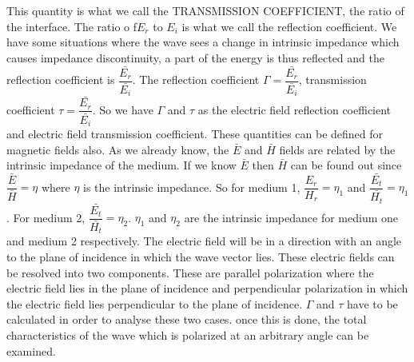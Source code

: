 This quantity is what we call the TRANSMISSION COEFFICIENT, the ratio of the interface. The ratio o f$ E_r$ to $E_i$ is what we call the reflection coefficient. We have some situations where the wave sees a change in intrinsic impedance which causes impedance discontinuity, a part of the energy is thus reflected and the reflection coefficient is $\dfrac{\bar{E_r}}{\bar{E_i}}$. The reflection coefficient $\Gamma=\dfrac{\bar{E_r}}{\bar{E_i}}$, transmission coefficient $\tau=\dfrac{\bar{E_r}}{\bar{E_i}}$. So we have $\Gamma$ and $\tau$ as the electric field reflection coefficient and electric field transmission coefficient. These quantities can be defined for magnetic fields also. As we already know, the $\bar{E}$ and $\bar{ H}$ fields are related by the intrinsic impedance of the medium. If we know $\bar{E}$ then $\bar{H}$ can be found out since $\dfrac{\bar{E}}{\bar{H}}=\eta$ where $\eta$ is the intrinsic impedance. So for medium 1,  $\dfrac{E_r}{H_r}=\eta_1$  and $\dfrac{\bar{E_t}}{\bar{H_t}}=\eta_1$. For medium 2, $\dfrac{\bar{E_t}}{\bar{H_t}}=\eta_2$. $\eta_1$ and $\eta_2$ are the intrinsic impedance for medium one and medium 2 respectively. The electric field will be in a direction with an angle to the plane of incidence in which the wave vector lies. These electric fields can be resolved into two components. These are parallel polarization where the electric field lies in the plane of incidence and perpendicular polarization in which the electric field lies perpendicular to the plane of incidence. $\Gamma$ and $\tau$ have to be calculated in order to analyse these two cases. once this is done, the total characteristics of the wave which is polarized at an arbitrary angle can be examined.